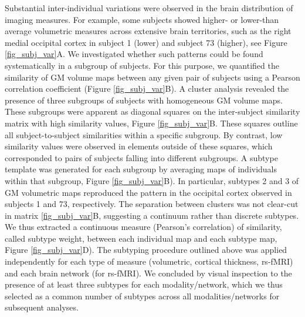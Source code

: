 \documentclass[authoryear]{elsarticle}
\begin{document}


Substantial inter-individual variations were observed in the brain distribution of imaging measures. For example, some subjects showed higher- or lower-than average volumetric measures across extensive brain territories, such as the right medial occipital cortex in subject 1 (lower) and subject 73 (higher), see Figure \ref{fig_subj_var}A. We investigated whether such patterns could be found systematically in a subgroup of subjects. For this purpose, we quantified the similarity of GM volume maps between any given pair of subjects using a Pearson correlation coefficient (Figure \ref{fig_subj_var}B). A cluster analysis revealed the presence of three subgroups of subjects with homogeneous GM volume maps. These subgroups were apparent as diagonal squares on the inter-subject similarity matrix with high similarity values, Figure \ref{fig_subj_var}B. These squares outline all subject-to-subject similarities within a specific subgroup. By contrast, low similarity values were observed in elements outside of these squares, which corresponded to pairs of subjects falling into different subgroups. A subtype template was generated for each subgroup by averaging maps of individuals within that subgroup, Figure \ref{fig_subj_var}B). In particular, subtypes 2 and 3 of GM volumetric maps reproduced the pattern in the occipital cortex observed in subjects 1 and 73, respectively. The separation between clusters was not clear-cut in matrix \ref{fig_subj_var}B, suggesting a continuum rather than discrete subtypes. We thus extracted a continuous measure (Pearson's correlation) of similarity, called subtype weight, between each individual map and each subtype map, Figure \ref{fig_subj_var}D). The subtyping procedure outlined above was applied independently for each type of measure (volumetric, cortical thickness, rs-fMRI) and each brain network (for rs-fMRI). We concluded by visual inspection to the presence of at least three subtypes for each modality/network, which we thus selected as a common number of subtypes across all modalities/networks for subsequent analyses.
\end{document}
